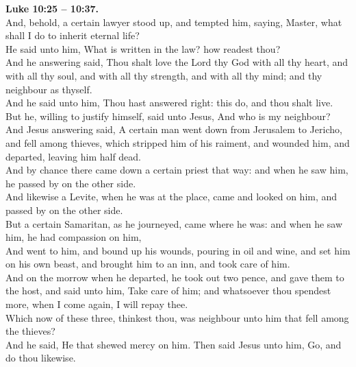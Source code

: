 \documentclass[10pt]{article} %
\begin{document}
{\begin{minipage}[t]{0.45\textwidth}
\textbf{Luke 10:25 -- 10:37.}\\
And, behold, a certain lawyer stood up, and tempted him, saying, Master, what shall I do to inherit eternal life?\\
He said unto him, What is written in the law? how readest thou?\\
And he answering said, Thou shalt love the Lord thy God with all thy heart, and with all thy soul, and with all thy strength, and with all thy mind; and thy neighbour as thyself.\\
And he said unto him, Thou hast answered right: this do, and thou shalt live.\\
But he, willing to justify himself, said unto Jesus, And who is my neighbour?\\
And Jesus answering said, A certain man went down from Jerusalem to Jericho, and fell among thieves, which stripped him of his raiment, and wounded him, and departed, leaving him half dead.\\
And by chance there came down a certain priest that way: and when he saw him, he passed by on the other side.\\
And likewise a Levite, when he was at the place, came and looked on him, and passed by on the other side.\\
But a certain Samaritan, as he journeyed, came where he was: and when he saw him, he had compassion on him,\\
And went to him, and bound up his wounds, pouring in oil and wine, and set him on his own beast, and brought him to an inn, and took care of him.\\
And on the morrow when he departed, he took out two pence, and gave them to the host, and said unto him, Take care of him; and whatsoever thou spendest more, when I come again, I will repay thee.\\
Which now of these three, thinkest thou, was neighbour unto him that fell among the thieves?\\
And he said, He that shewed mercy on him. Then said Jesus unto him, Go, and do thou likewise.\\
\end{minipage}}
\newpage\huge
\onehalfspacing %
\end{document}
